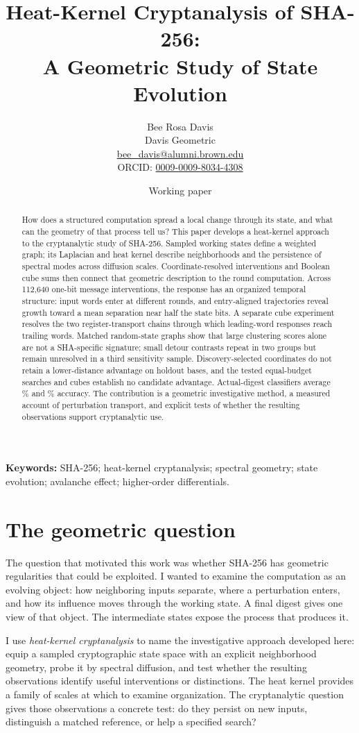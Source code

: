 \documentclass[11pt]{article}
\title{Heat-Kernel Cryptanalysis of SHA-256:\\A Geometric Study of State Evolution}
\author{Bee Rosa Davis\\Davis Geometric\\\small \href{mailto:bee_davis@alumni.brown.edu}{bee\_davis@alumni.brown.edu}\\\small ORCID: \href{https://orcid.org/0009-0009-8034-4308}{0009-0009-8034-4308}}
\date{Working paper}
\begin{document}
\maketitle
\begin{abstract}
How does a structured computation spread a local change through its state, and what can the geometry of that process tell us? This paper develops a heat-kernel approach to the cryptanalytic study of SHA-256. Sampled working states define a weighted graph; its Laplacian and heat kernel describe neighborhoods and the persistence of spectral modes across diffusion scales. Coordinate-resolved interventions and Boolean cube sums then connect that geometric description to the round computation. Across 112,640 one-bit message interventions, the response has an organized temporal structure: input words enter at different rounds, and entry-aligned trajectories reveal growth toward a mean separation near half the state bits. A separate cube experiment resolves the two register-transport chains through which leading-word responses reach trailing words. Matched random-state graphs show that large clustering scores alone are not a SHA-specific signature; small detour contrasts repeat in two groups but remain unresolved in a third sensitivity sample. Discovery-selected coordinates do not retain a lower-distance advantage on holdout bases, and the tested equal-budget searches and cubes establish no candidate advantage. Actual-digest classifiers average \RFAccuracy\% and \SVMAccuracy\% accuracy. The contribution is a geometric investigative method, a measured account of perturbation transport, and explicit tests of whether the resulting observations support cryptanalytic use.
\end{abstract}
\noindent\textbf{Keywords:} SHA-256; heat-kernel cryptanalysis; spectral geometry; state evolution; avalanche effect; higher-order differentials.

\section{The geometric question}
The question that motivated this work was whether SHA-256 has geometric regularities that could be exploited. I wanted to examine the computation as an evolving object: how neighboring inputs separate, where a perturbation enters, and how its influence moves through the working state. A final digest gives one view of that object. The intermediate states expose the process that produces it.

I use \emph{heat-kernel cryptanalysis} to name the investigative approach developed here: equip a sampled cryptographic state space with an explicit neighborhood geometry, probe it by spectral diffusion, and test whether the resulting observations identify useful interventions or distinctions. The heat kernel provides a family of scales at which to examine organization. The cryptanalytic question gives those observations a concrete test: do they persist on new inputs, distinguish a matched reference, or help a specified search?
\end{document}
